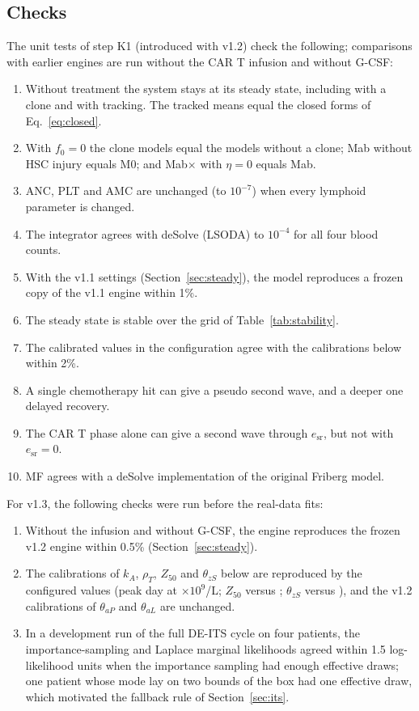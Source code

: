 \documentclass[11pt]{article}
\begin{document}
\subsection{Checks}
The unit tests of step K1 (introduced with v1.2) check the following; comparisons with earlier engines are run without the CAR T infusion and without G-CSF:
\begin{enumerate}
\item Without treatment the system stays at its steady state, including with a clone and with tracking. The tracked means equal the closed forms of Eq.~\ref{eq:closed}.
\item With $f_0=0$ the clone models equal the models without a clone; Mab without HSC injury equals M0; and Mab$\times$ with $\eta=0$ equals Mab.
\item ANC, PLT and AMC are unchanged (to $10^{-7}$) when every lymphoid parameter is changed.
\item The integrator agrees with deSolve (LSODA) to $10^{-4}$ for all four blood counts.
\item With the v1.1 settings (Section~\ref{sec:steady}), the model reproduces a frozen copy of the v1.1 engine within 1\%.
\item The steady state is stable over the grid of Table~\ref{tab:stability}.
\item The calibrated values in the configuration agree with the calibrations below within 2\%.
\item A single chemotherapy hit can give a pseudo second wave, and a deeper one delayed recovery.
\item The CAR T phase alone can give a second wave through $e_{\mathrm{sr}}$, but not with $e_{\mathrm{sr}}=0$.
\item MF agrees with a deSolve implementation of the original Friberg model.
\end{enumerate}
For v1.3, the following checks were run before the real-data fits:
\begin{enumerate}
\item Without the infusion and without G-CSF, the engine reproduces the frozen v1.2 engine within 0.5\% (Section~\ref{sec:steady}).
\item The calibrations of $k_A$, $\rho_T$, $Z_{50}$ and $\theta_{zS}$ below are reproduced by the configured values (peak day \valCartPeakDayModel{} at \valCartPeakModel{} $\times10^9$/L; $Z_{50}$ \valZfiftyModel{} versus \valZfifty; $\theta_{zS}$ \valThzsModel{} versus \valThzs), and the v1.2 calibrations of $\theta_{aP}$ and $\theta_{aL}$ are unchanged.
\item In a development run of the full DE-ITS cycle on four patients, the importance-sampling and Laplace marginal likelihoods agreed within 1.5 log-likelihood units when the importance sampling had enough effective draws; one patient whose mode lay on two bounds of the box had one effective draw, which motivated the fallback rule of Section~\ref{sec:its}.
\end{enumerate}
\end{document}
